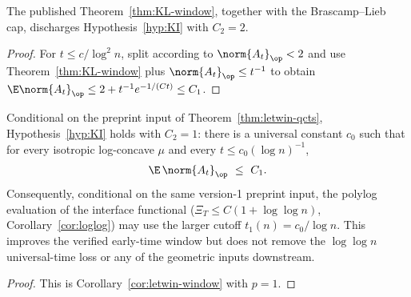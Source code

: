 \documentclass[../../main.tex]{subfiles}
\begin{document}
\begin{corollary}
\label{cor:KI-discharged}
The published Theorem~\ref{thm:KL-window}, together with the Brascamp--Lieb cap, discharges
Hypothesis~\ref{hyp:KI} with $C_2=2$.
\end{corollary}

\begin{proof}
For $t\le c/\log^2n$, split according to $\norm{A_t}_\op<2$ and use
Theorem~\ref{thm:KL-window} plus $\norm{A_t}_\op\le t^{-1}$ to obtain
$\E\norm{A_t}_\op\le2+t^{-1}e^{-1/(Ct)}\le C_1$.
\end{proof}

\begin{corollary}
\label{cor:KI-letwin}
Conditional on the preprint input of Theorem~\ref{thm:letwin-qcts},
Hypothesis~\ref{hyp:KI} holds with $C_2=1$: there is a universal constant $c_0$ such
that for every isotropic log-concave $\mu$ and every $t\le c_0(\log n)^{-1}$,
\[
  \E\,\norm{A_t}_\op\ \le\ C_1 .
\]
Consequently, conditional on the same version-1 preprint input, the polylog evaluation of the
interface functional ($\Xi_T\le C(1+\log\log n)$, Corollary~\ref{cor:loglog}) may use the
larger cutoff $t_1(n)=c_0/\log n$.  This improves the verified early-time window but does not
remove the $\log\log n$ universal-time loss or any of the geometric inputs downstream.
\end{corollary}

\begin{proof}
This is Corollary~\ref{cor:letwin-window} with $p=1$.
\end{proof}
\end{document}
